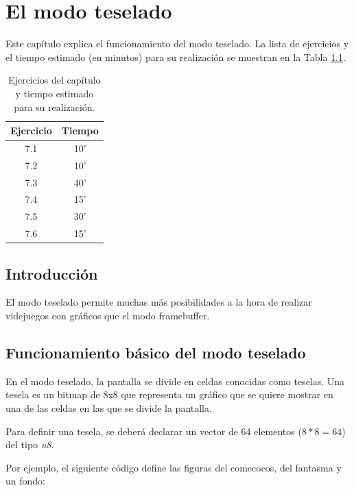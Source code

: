 \chapter{El modo teselado}

Este capítulo explica el funcionamiento del modo teselado. La lista de ejercicios y el tiempo estimado (en minutos) para su realización se muestran en la Tabla \ref{c7_tab:ejercios}.

\begin{table}[t]
	\centering
	\caption{Ejercicios del capítulo y tiempo estimado para su realización.}
	\begin{tabular}{|c|c|}
		\hline 
		Ejercicio & Tiempo \\ 
		\hline 
		7.1 & 10' \\ 
		7.2 & 10' \\ 
		7.3 & 40' \\ 
		7.4 & 15' \\ 
		7.5 & 30' \\ 
		7.6 & 15' \\ 
		\hline 
	\end{tabular} 
	\label{c7_tab:ejercios}
\end{table}


\section{Introducción}
El modo teselado permite muchas más posibilidades a la hora de realizar videjuegos con gráficos que el modo framebuffer. 

\section{Funcionamiento básico del modo teselado}
En el modo teselado, la pantalla se divide en celdas conocidas como teselas. Una tesela es un bitmap de 8x8 que representa un gráfico que se quiere mostrar en una de las celdas en las que se divide la pantalla. 

Para definir una tesela, se deberá declarar un vector de 64 elementos ($8*8=64$) del tipo \textit{u8}. 

Por ejemplo, el siguiente código define las figuras del comecocos, del fantasma y un fondo:

